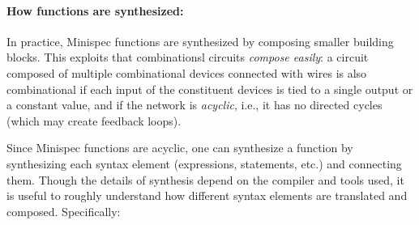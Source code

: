 \paragraph{How functions are synthesized:}
In practice, Minispec functions are synthesized by composing smaller building blocks.
This exploits that combinationsl circuits \emph{compose easily}:
a circuit composed of multiple combinational devices connected with wires is also combinational
if each input of the constituent devices is tied to a single output or a constant value,
and if the network is \emph{acyclic}, i.e., it has no directed cycles
(which may create feedback loops).

Since Minispec functions are acyclic, one can synthesize a function by synthesizing each syntax element
(expressions, statements, etc.) and connecting them.
Though the details of synthesis depend on the compiler and tools used,
it is useful to roughly understand how different syntax elements are translated and composed.
Specifically:
